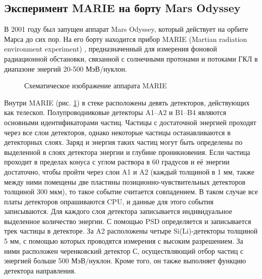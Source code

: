 \documentclass[12pt,a4paper]{report} %
\begin{document}
\subsection{Эксперимент MARIE на борту Mars Odyssey}
В 2001 году был запущен аппарат Mars Odyssey, который действует на орбите Марса до сих пор. На его борту находится прибор MARIE (Martian radiation environment experiment) \cite{MARIE}, предназначенный для измерения фоновой радиационной обстановки, связанной с солнечными протонами и потоками ГКЛ в диапазоне энергий 20-500 МэВ/нуклон. 
\begin{figure}
	\noindent{}
	\caption{Схематическое изображение аппарата MARIE}
	\label{figMARIE}
\end{figure}
Внутри MARIE (рис. \ref{figMARIE}) в стеке расположены девять детекторов, действующих как телескоп. Полупроводниковые детекторы A1--A2 и B1--B4 являются основными идентификаторами частиц. Частицы с достаточной энергией проходят через все слои детекторов, однако некоторые частицы останавливаются в детекторных слоях.  Заряд и энергия таких частиц могут быть определены по выделенной в слоях детектора энергии и глубине проникновения. Если частица проходит в пределах конуса с углом раствора в 60 градусов и её энергии достаточно, чтобы пройти через слои A1 и A2 (каждый толщиной в 1 мм, также между ними помещены две пластины позиционно-чувствительных детекторов толщиной 300 мкм), то такое событие считается совпадением. В таком случае все платы детекторов опрашиваются CPU, и данные для этого события записываются. Для каждого слоя детектора записывается индивидуальное выделенное количество энергии. С помощью PSD определяется и записывается трек частицы в детекторе. За A2 расположены четыре Si(Li)-детекторы толщиной 5 мм, с помощью которых проводятся измерения с высоким разрешением. За ними расположен черенковский детектор С, осуществляющий отбор частиц с энергией больше 500 МэВ/нуклон. Кроме того, он также выполняет функцию детектора направления. 
\end{document}

